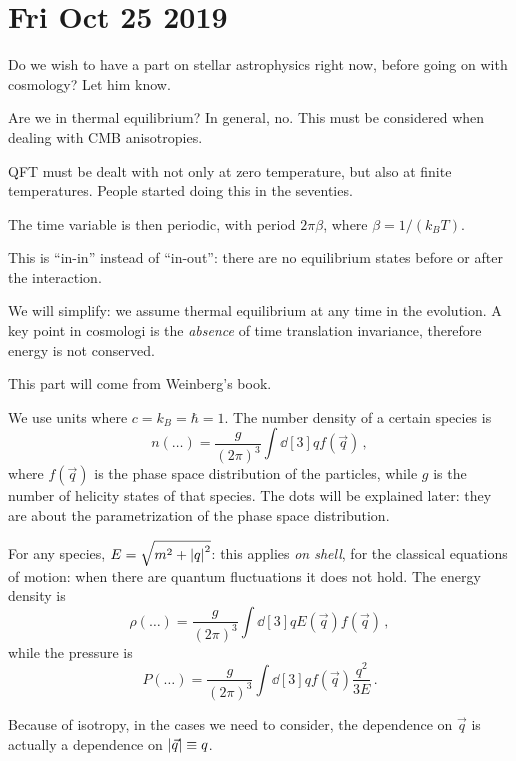 \documentclass[main.tex]{subfiles}
\begin{document}
\section*{Fri Oct 25 2019}

Do we wish to have a part on stellar astrophysics right now, before going on with cosmology? Let him know.

Are we in thermal equilibrium?
In general, no.
This must be considered when dealing with CMB anisotropies.

QFT must be dealt with not only at zero temperature, but also at finite temperatures.
People started doing this in the seventies.

The time variable is then periodic, with period \(2 \pi \beta \), where \(\beta  = 1/(k_B T)\).


This is ``in-in'' instead of ``in-out'': there are no equilibrium states before or after the interaction.

We will simplify: we assume thermal equilibrium at any time in the evolution.
A key point in cosmologi is the \emph{absence} of time translation invariance, therefore energy is not conserved.

This part will come from Weinberg's book.

We use units where \(c = k_B = \hbar = 1\). The number density of a certain species is 
%
\begin{equation}
  n(\dots ) = \frac{g}{(2\pi )^{3}} \int  \dd[3]{q} f(\vec{q})
\,,
\end{equation}
%
where \(f(\vec{q})\) is the phase space distribution of the particles, while \(g\) is the number of helicity states of that species.
The dots will be explained later: they are about the parametrization of the phase space distribution.

For any species, \(E = \sqrt{m^2 + \abs{q}^2} \): this applies \emph{on shell}, for the classical equations of motion: when there are quantum fluctuations it does not hold.
The energy density is 
%
\begin{equation}
  \rho (\dots) = \frac{g}{(2\pi )^3} \int  \dd[3]{q} E(\vec{q}) f(\vec{q}) 
\,,
\end{equation}
%
while the pressure is 
%
\begin{equation}
  P (\dots) = \frac{g}{(2\pi )^3} \int  \dd[3]{q} f(\vec{q}) \frac{q^2}{3E}
\,.
\end{equation}

Because of isotropy, in the cases we need to consider, the dependence on \(\vec{q}\) is actually a dependence on \(\abs{\vec{q}} \equiv q \).
\end{document}
